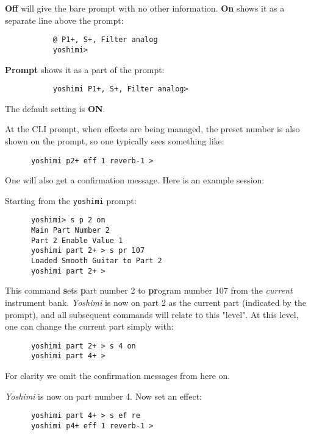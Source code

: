    \textbf{Off} will give the bare prompt with no other information.
   \textbf{On} shows it as a separate line above the prompt:

   \begin{verbatim}
           @ P1+, S+, Filter analog
           yoshimi>
   \end{verbatim}

   \textbf{Prompt} shows it as a part of the prompt:

   \begin{verbatim}
           yoshimi P1+, S+, Filter analog>
   \end{verbatim}

   The default setting is \textbf{ON}.

   At the CLI prompt, when effects are being managed, the preset number is
   also shown on the prompt, so one typically sees something like:

   \begin{verbatim}
      yoshimi p2+ eff 1 reverb-1 >
   \end{verbatim}

   One will also get a confirmation message.
   Here is an example session:

   Starting from the \texttt{yoshimi} prompt:

   \begin{verbatim}
      yoshimi> s p 2 on
      Main Part Number 2
      Part 2 Enable Value 1
      yoshimi part 2+ > s pr 107
      Loaded Smooth Guitar to Part 2
      yoshimi part 2+ >
   \end{verbatim}

   This command \textbf{s}ets \textbf{p}art number 2 to \textbf{pr}ogram
   number 107 from the \textsl{current} instrument bank.
   \textsl{Yoshimi} is now on part 2 as the current part (indicated by the
   prompt), and all subsequent commands will relate to this "level". At this
   level, one can change the current part simply with:

   \begin{verbatim}
      yoshimi part 2+ > s 4 on
      yoshimi part 4+ >
   \end{verbatim}

   For clarity we omit the confirmation messages from here on.

   \textsl{Yoshimi} is now on part number 4. Now set an effect:

   \begin{verbatim}
      yoshimi part 4+ > s ef re
      yoshimi p4+ eff 1 reverb-1 >
   \end{verbatim}

